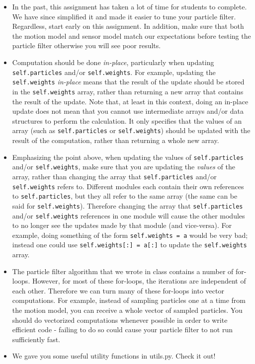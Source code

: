 \documentclass[final]{article}
\begin{document}
\begin{itemize}

\item
In the past, this assignment has taken a lot of time for students to complete. We have since simplified it and made it easier to tune your particle filter. Regardless, start early on this assignment. In addition, make sure that both the motion model and sensor model match our expectations before testing the particle filter otherwise you will see poor results.

\item Computation should be done \textit{in-place}, particularly when updating \texttt{self.particles} and/or \texttt{self.weights}. For example, updating the \texttt{self.weights} \textit{in-place} means that the result of the update should be stored in the \texttt{self.weights} array, rather than returning a new array that contains the result of the update. Note that, at least in this context, doing an in-place update does not mean that you cannot use intermediate arrays and/or data structures to perform the calculation. It only specifies that the values of an array (such as \texttt{self.particles} or \texttt{self.weights}) should be updated with the result of the computation, rather than returning a whole new array.

\item Emphasizing the point above, when updating the values of \texttt{self.particles} and/or \texttt{self.weights}, make sure that you are updating the \textit{values} of the array, rather than changing the array that \texttt{self.particles} and/or \texttt{self.weights} refers to. Different modules each contain their own references to \texttt{self.particles}, but they all refer to the same array (the same can be said for \texttt{self.weights}). Therefore changing the array that \texttt{self.particles} and/or \texttt{self.weights} references in one module will cause the other modules to no longer see the updates made by that module (and vice-versa). For example, doing something of the form \texttt{self.weights = a} would be very bad; instead one could use \texttt{self.weights[:] = a[:]} to update the \texttt{self.weights} array.

\item The particle filter algorithm that we wrote in class contains a number of for-loops. However, for most of these for-loops, the iterations are independent of each other. Therefore we can turn many of these for-loops into vector computations. For example, instead of sampling particles one at a time from the motion model, you can receive a whole vector of sampled particles. You should do vectorized computations whenever possible in order to write efficient code - failing to do so could cause your particle filter to not run sufficiently fast.

\item We gave you some useful utility functions in utils.py. Check it out!

\end{itemize}
\end{document}
